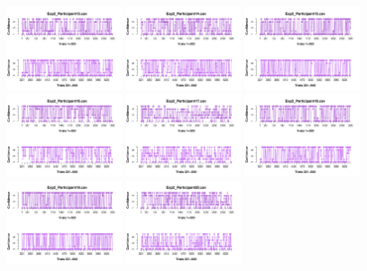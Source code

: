 \begin{itemize}
\begin{figure}[th]
\includegraphics[width=0.30\textwidth]{Figures/Rating_Exp2_P13} \includegraphics[width=0.30\textwidth]{Figures/Rating_Exp2_P14} \includegraphics[width=0.30\textwidth]{Figures/Rating_Exp2_P15}
\includegraphics[width=0.30\textwidth]{Figures/Rating_Exp2_P16} \includegraphics[width=0.30\textwidth]{Figures/Rating_Exp2_P17} \includegraphics[width=0.30\textwidth]{Figures/Rating_Exp2_P18}
\includegraphics[width=0.30\textwidth]{Figures/Rating_Exp2_P19} \includegraphics[width=0.30\textwidth]{Figures/Rating_Exp2_P20} 

\end{figure}
\end{itemize}

